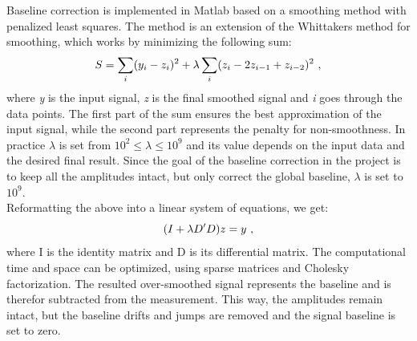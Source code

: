 \documentclass{article}
\begin{document}
{\begin{figure}[h!]
\end{figure}
\\
\\
Baseline correction is implemented in Matlab based on a smoothing method with penalized least squares\cite{ref4}. The method is an extension of the Whittakers method for smoothing, which works by minimizing the following sum: 
\begin{equation}
S=\sum_{i} (y_i - z_i)^2 + \lambda\sum_{i} (z_i - 2z_{i-1} + z_{i-2})^2\thinspace \thinspace ,
\end{equation}
where \textit{y} is the input signal, \textit{z} is the final smoothed signal and \textit{i} goes through the data points.
The first part of the sum ensures the best approximation of the input signal, while the second part represents the penalty for non-smoothness. 
In practice $\lambda$ is set from $ 10^{2} \leq \lambda \leq 10^{9}$ and its value depends on the input data and the desired final result. Since the goal of the baseline correction in the project is to keep all the amplitudes intact, but only correct the global baseline, $\lambda$ is set to $10^{9}$.
\\
Reformatting the above into a linear system of equations, we get:
\begin{equation}
(I + \lambda D'D)z = y\thinspace \thinspace ,
\end{equation}
where I is the identity matrix and D is its differential matrix. 
The computational time and space can be optimized, using sparse matrices and Cholesky factorization. The resulted over-smoothed signal represents the baseline and is therefor subtracted from the measurement. This way, the amplitudes remain intact, but the baseline drifts and jumps are removed and the signal baseline is set to zero. 
}
\end{document}
